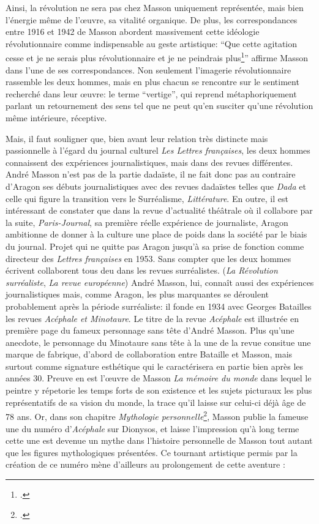 Ainsi, la révolution ne sera pas chez Masson uniquement représentée, mais bien l’énergie même de l’\oe{}uvre, sa vitalité organique. De plus, les correspondances  entre 1916 et 1942 de Masson abordent massivement cette idéologie  révolutionnaire comme indispensable au geste artistique: \enquote{Que cette agitation cesse et je ne serais plus révolutionnaire et je ne peindrais plus\footcite[p. 102]{anneessurrealistes}} affirme Masson dans l’une de ses correspondances. Non seulement l’imagerie révolutionnaire rassemble les deux hommes, mais en plus chacun se rencontre sur le sentiment recherché dans leur \oe{}uvre: le terme \enquote{vertige}, qui reprend métaphoriquement parlant un retournement des sens tel que ne peut qu’en susciter qu’une révolution même intérieure, réceptive. 

Mais, il faut souligner que, bien avant leur relation très distincte mais passionnelle à l’égard du journal culturel \emph{Les Lettres françaises}, les deux hommes connaissent des expériences journalistiques, mais dans des revues différentes. André Masson n’est pas de la partie dadaïste, il ne fait donc pas au contraire d’Aragon ses débuts journalistiques avec des revues dadaïstes telles que \emph{Dada} et celle qui figure la transition vers le Surréalisme, \emph{Littérature}. En outre, il est intéressant de constater que dans la revue d’actualité théâtrale où il collabore par la suite, \emph{Paris-Journal}, sa première réelle expérience de journaliste, Aragon ambitionne de donner à la culture une place de poids dans la société par le biais du journal. Projet qui ne quitte pas Aragon jusqu’à sa prise de fonction comme directeur des \emph{Lettres françaises} en 1953. Sans compter que les deux hommes écrivent collaborent tous deu dans les revues surréalistes. (\emph{La Révolution surréaliste}, \emph{La revue européenne}) André Masson, lui,  connaît aussi des expériences journalistiques mais, comme Aragon, les plus marquantes se déroulent probablement après la période surréaliste: il fonde en 1934 avec Georges Batailles les revues \emph{Acéphale et Minotaure}. Le titre de la revue \emph{Acéphale} est illustrée en première page du fameux personnage sans tête d’André Masson. Plus qu'une anecdote, le personnage du Minotaure sans tête à la une de la revue consitue une marque de fabrique, d'abord de collaboration entre Bataille et Masson, mais surtout comme signature esthétique qui le caractérisera en partie bien après les années 30. Preuve en est l'\oe{}uvre de Masson \emph{La mémoire du monde} dans lequel le peintre y répetorie les temps forts de son existence et les sujets picturaux les plus  représentatifs de sa vision du monde, la trace qu'il laisse sur celui-ci déjà âge de 78 ans. Or, dans son chapitre \emph{Mythologie personnelle}\footcite[p124]{memoiremonde}, Masson publie la fameuse une du numéro d'\emph{Acéphale}
 sur Dionysos, et laisse l'impression qu'à long terme cette une est devenue un mythe dans l'histoire personnelle de Masson tout autant que les figures mythologiques présentées. Ce tournant artistique permis par la création de ce numéro mène d'ailleurs au prolongement de cette aventure : 
 
